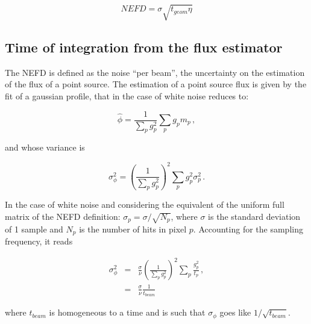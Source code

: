 \begin{equation}
NEFD = \sigma \sqrt{t_{geom}\eta}
\label{eq:nefd_t_geom}
\end{equation}


\subsection{Time of integration from the flux estimator}

The NEFD is defined as the noise ``per beam'', the uncertainty on the estimation
of the flux of a point source. The estimation of a point source flux is given by
the fit of a gaussian profile, that in the case of white noise reduces to:

\begin{equation}
\hat{\phi} = \frac{1}{\sum_p g_p^2}\sum_p g_p m_p\,,
\label{eq:phi_def}
\end{equation}

and whose variance is

\begin{equation}
\sigma_\phi^2 = \left(\frac{1}{\sum_p g_p^2}\right)^2\sum_p g_p^2\sigma_p^2\,.
\label{eq:sigma_phi_def}
\end{equation}

In the case of white noise and considering the equivalent of the
uniform full matrix of the NEFD definition: $\sigma_p = \sigma/\sqrt{N_p}$,
where $\sigma$ is the standard deviation of 1 sample and $N_p$ is the number of
hits in pixel $p$. Accounting for the sampling frequency, it reads

\begin{eqnarray}
\sigma_\phi^2 &=& \frac{\sigma}{\nu}\left(\frac{1}{\sum_p g_p^2}\right)^2\sum_p \frac{g_p^2}{t_p}\,, \nonumber\\
&=&\frac{\sigma}{\nu}\frac{1}{t_{beam}}\,
\label{eq:sigma_phi_def_2}
\end{eqnarray}

where $t_{beam}$ is homogeneous to a time and is such that $\sigma_\phi$ goes
like $1/\sqrt{t_{beam}}$.\\


